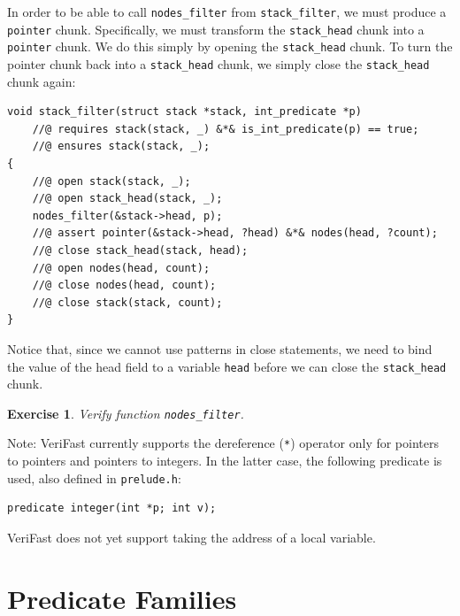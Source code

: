 \documentclass{article}
\newtheorem{exercise}{Exercise}
\begin{document}
In order to be able to call \lstinline!nodes_filter! from
\lstinline!stack_filter!, we must produce a \lstinline!pointer!
chunk. Specifically, we must transform the
\lstinline!stack_head! chunk into a \lstinline!pointer! chunk.
We do this simply by opening the \lstinline!stack_head! chunk.
To turn the pointer chunk back into a \lstinline!stack_head!
chunk, we simply close the \lstinline!stack_head! chunk again:
\begin{lstlisting}
void stack_filter(struct stack *stack, int_predicate *p)
    //@ requires stack(stack, _) &*& is_int_predicate(p) == true;
    //@ ensures stack(stack, _);
{
    //@ open stack(stack, _);
    //@ open stack_head(stack, _);
    nodes_filter(&stack->head, p);
    //@ assert pointer(&stack->head, ?head) &*& nodes(head, ?count);
    //@ close stack_head(stack, head);
    //@ open nodes(head, count);
    //@ close nodes(head, count);
    //@ close stack(stack, count);
}
\end{lstlisting}
Notice that, since we cannot use patterns in close statements,
we need to bind the value of the head field to a variable
\lstinline!head! before we can close the \lstinline!stack_head!
chunk.

\begin{exercise}\label{exercise:byref}
Verify function \lstinline!nodes_filter!.
\end{exercise}

Note: VeriFast currently supports the dereference
(\lstinline!*!) operator only for pointers to pointers and
pointers to integers. In the latter case, the following
predicate is used, also defined in \texttt{prelude.h}:
\begin{lstlisting}
predicate integer(int *p; int v);
\end{lstlisting}
VeriFast does not yet support taking the address of a local
variable.

\section{Predicate Families}\label{section:predicate-families}
\end{document}
